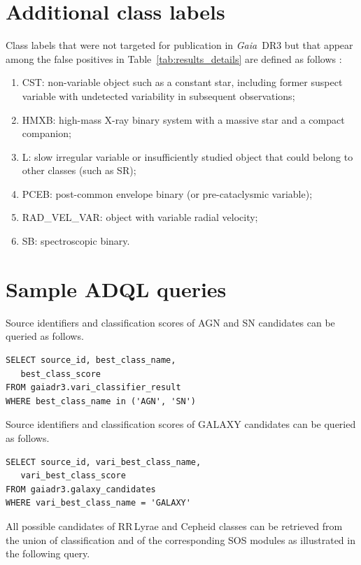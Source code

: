 \documentclass[longauth]{aa}
\def\gdr3{\textit{Gaia}~DR3\xspace}
\begin{document}
\begin{appendix}
\section{Additional class labels\label{app:FP_labels}}
Class labels that were not targeted for publication in \gdr3 but that appear among the false positives in Table~\ref{tab:results_details} are defined as follows \citep[consistently with][]{DR3-DPACP-177}:
\begin{enumerate}
    \item CST: non-variable object such as a constant star, including former suspect variable with undetected variability in subsequent observations; 
    \item HMXB: high-mass X-ray binary system with a massive star and a compact companion;
    \item L: slow irregular variable or insufficiently studied object that could belong to other classes (such as SR);
    \item PCEB: post-common envelope binary (or pre-cataclysmic variable);
    \item RAD\_VEL\_VAR: object with variable radial velocity; 
    \item SB: spectroscopic binary.
\end{enumerate}

\section{Sample ADQL queries\label{app:queries}}

Source identifiers and classification scores of AGN and SN candidates can be queried as follows.

\begin{verbatim}
SELECT source_id, best_class_name, 
   best_class_score
FROM gaiadr3.vari_classifier_result
WHERE best_class_name in ('AGN', 'SN') 
\end{verbatim}

Source identifiers and classification scores of GALAXY candidates can be queried as follows.

\begin{verbatim}
SELECT source_id, vari_best_class_name, 
   vari_best_class_score
FROM gaiadr3.galaxy_candidates
WHERE vari_best_class_name = 'GALAXY'
\end{verbatim}


All possible candidates of RR\,Lyrae and Cepheid classes can be retrieved from the union of classification and of the corresponding SOS modules as illustrated in the following query.


\end{appendix}
\end{document}
